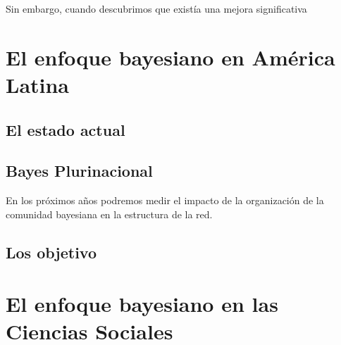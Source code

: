 \documentclass[a4paper,11pt]{book}
\theoremstyle{definition}
\begin{document}

Sin embargo, cuando descubrimos que existía una mejora significativa

\section{El enfoque bayesiano en América Latina} \label{sec:bayesplurinacional}
%
%



\subsection{El estado actual}

\subsection{Bayes Plurinacional}

En los próximos años podremos medir el impacto de la organización de la comunidad bayesiana en la estructura de la red.

\subsection{Los objetivo}

\section{El enfoque bayesiano en las Ciencias Sociales} \label{sec:volverAlFuturo}
\end{document}

